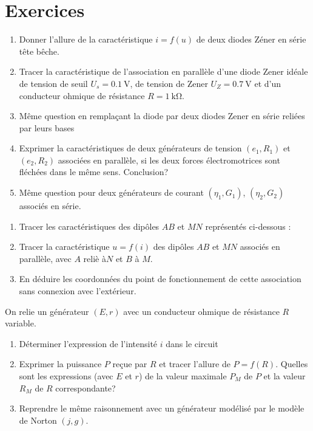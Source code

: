 \clearpage
\section{Exercices}%
\begin{exercice}%
  \begin{enumerate}
    \item Donner l'allure de la caractéristique \(i=f(u)\) de deux diodes Zéner 
      en série tête bêche.
    \item Tracer la caractéristique de l'association en parallèle d'une diode 
      Zener idéale de tension de seuil \(U_s=\SI{0.1}{\volt}\), de tension de 
      Zener \(U_Z = \SI{0.7}{\volt}\) et d'un conducteur ohmique de résistance 
      \(R=\SI{1}{\kilo\ohm}\).
    \item Même question en remplaçant la diode par deux diodes Zener en série 
      reliées par leurs bases
    \item Exprimer la caractéristiques de deux générateurs de tension \((e_1, 
      R_1)\) et \((e_2, R_2)\) associées en parallèle, si les deux forces 
      électromotrices sont fléchées dans le même sens. Conclusion?
    \item Même question pour deux générateurs de courant \((\eta_1, G_1)\), 
      \((\eta_2, G_2)\) associés en série.
  \end{enumerate}
\end{exercice}%
\begin{exercice}%
  \begin{enumerate}
    \item Tracer les caractéristiques des dipôles \(AB\) et \(MN\) représentés 
      ci-dessous :
    \item Tracer la caractéristique \(u=f(i)\) des dipôles \(AB\) et \(MN\) 
      associés en parallèle, avec \(A\) reliè à\(N\) et \(B\) à \(M\).
    \item En déduire les coordonnées du point de fonctionnement de cette 
      association sans connexion avec l'extérieur.
  \end{enumerate}
\end{exercice}%

\begin{exercice}%
  On relie un générateur \((E, r)\) avec un conducteur ohmique de résistance 
  \(R\) variable.
  \begin{enumerate}
    \item Déterminer l'expression de l'intensité \(i\) dans le circuit
    \item Exprimer la puissance \(P\) reçue par \(R\) et tracer l'allure de 
      \(P=f(R)\). Quelles sont les expressions (avec \(E\) et \(r\)) de la 
      valeur maximale \(P_M\) de \(P\) et la valeur \(R_M\) de \(R\) 
      correspondante?
    \item Reprendre le même raisonnement avec un générateur modélisé par le 
      modèle de Norton \((j, g)\).
  \end{enumerate}
\end{exercice}%

